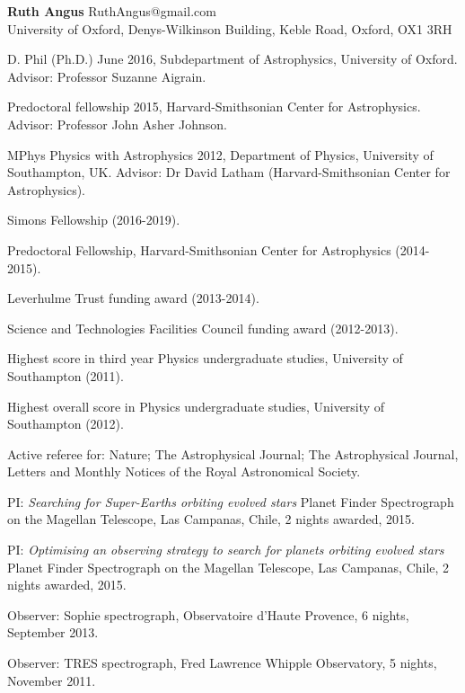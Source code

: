 \documentclass[12pt,letterpaper]{article}
\begin{document}
\thispagestyle{empty}\sloppy\sloppypar\raggedbottom

\textbf{\Large Ruth Angus} \hfill
\textsf{\small RuthAngus@gmail.com} \\[0.5ex]
University of Oxford, Denys-Wilkinson Building, Keble Road, Oxford, OX1
3RH\\[0.5ex]

\begin{list}{}{\cvlist}
\item
D. Phil (Ph.D.) June 2016, Subdepartment of Astrophysics, University of
Oxford.
Advisor: Professor Suzanne Aigrain.
\item
Predoctoral fellowship 2015, Harvard-Smithsonian Center for Astrophysics.
Advisor: Professor John Asher Johnson.
\item
MPhys Physics with Astrophysics 2012, Department of Physics, University of
Southampton, UK. Advisor: Dr David Latham (Harvard-Smithsonian Center for
Astrophysics).
\end{list}

\begin{list}{}{\cvlist}
\item
Simons Fellowship (2016-2019).
\item
Predoctoral Fellowship, Harvard-Smithsonian Center for Astrophysics
(2014-2015).
\item
Leverhulme Trust funding award (2013-2014).
\item
Science and Technologies Facilities Council funding award (2012-2013).
\item
Highest score in third year Physics undergraduate studies, University of
Southampton (2011).
\item
Highest overall score in Physics undergraduate studies, University of
Southampton (2012).
\end{list}

\begin{list}{}{\cvlist}
\item
Active referee for: Nature; The Astrophysical Journal;
The Astrophysical Journal, Letters and Monthly Notices of the Royal
Astronomical Society.
\end{list}

\begin{list}{}{\cvlist}
\item
PI: {\it Searching for Super-Earths orbiting evolved stars} Planet Finder
Spectrograph on the Magellan Telescope, Las Campanas, Chile, 2 nights awarded,
2015.
\item
PI: {\it Optimising an observing strategy to search for planets orbiting
evolved stars} Planet Finder Spectrograph on the Magellan Telescope, Las
Campanas, Chile, 2 nights awarded, 2015.
\item
Observer: Sophie spectrograph, Observatoire d'Haute Provence, 6 nights,
September 2013.
\item
Observer: TRES spectrograph, Fred Lawrence Whipple Observatory, 5 nights,
November 2011.
\end{list}
\end{document}

